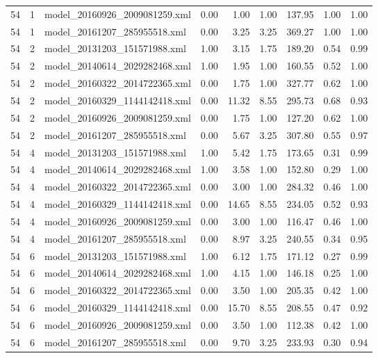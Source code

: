 \begin{table}[ht]
\begin{tabular}{rrlrrrrrr}
   54 &   1 & model\_20160926\_2009081259.xml & 0.00 & 1.00 & 1.00 & 137.95 & 1.00 & 1.00 \\ 
   54 &   1 & model\_20161207\_285955518.xml & 0.00 & 3.25 & 3.25 & 369.27 & 1.00 & 1.00 \\ 
   54 &   2 & model\_20131203\_151571988.xml & 1.00 & 3.15 & 1.75 & 189.20 & 0.54 & 0.99 \\ 
   54 &   2 & model\_20140614\_2029282468.xml & 1.00 & 1.95 & 1.00 & 160.55 & 0.52 & 1.00 \\ 
   54 &   2 & model\_20160322\_2014722365.xml & 0.00 & 1.75 & 1.00 & 327.77 & 0.62 & 1.00 \\ 
   54 &   2 & model\_20160329\_1144142418.xml & 0.00 & 11.32 & 8.55 & 295.73 & 0.68 & 0.93 \\ 
   54 &   2 & model\_20160926\_2009081259.xml & 0.00 & 1.75 & 1.00 & 127.20 & 0.62 & 1.00 \\ 
   54 &   2 & model\_20161207\_285955518.xml & 0.00 & 5.67 & 3.25 & 307.80 & 0.55 & 0.97 \\ 
   54 &   4 & model\_20131203\_151571988.xml & 1.00 & 5.42 & 1.75 & 173.65 & 0.31 & 0.99 \\ 
   54 &   4 & model\_20140614\_2029282468.xml & 1.00 & 3.58 & 1.00 & 152.80 & 0.29 & 1.00 \\ 
   54 &   4 & model\_20160322\_2014722365.xml & 0.00 & 3.00 & 1.00 & 284.32 & 0.46 & 1.00 \\ 
   54 &   4 & model\_20160329\_1144142418.xml & 0.00 & 14.65 & 8.55 & 234.05 & 0.52 & 0.93 \\ 
   54 &   4 & model\_20160926\_2009081259.xml & 0.00 & 3.00 & 1.00 & 116.47 & 0.46 & 1.00 \\ 
   54 &   4 & model\_20161207\_285955518.xml & 0.00 & 8.97 & 3.25 & 240.55 & 0.34 & 0.95 \\ 
   54 &   6 & model\_20131203\_151571988.xml & 1.00 & 6.12 & 1.75 & 171.12 & 0.27 & 0.99 \\ 
   54 &   6 & model\_20140614\_2029282468.xml & 1.00 & 4.15 & 1.00 & 146.18 & 0.25 & 1.00 \\ 
   54 &   6 & model\_20160322\_2014722365.xml & 0.00 & 3.50 & 1.00 & 205.35 & 0.42 & 1.00 \\ 
   54 &   6 & model\_20160329\_1144142418.xml & 0.00 & 15.70 & 8.55 & 208.55 & 0.47 & 0.92 \\ 
   54 &   6 & model\_20160926\_2009081259.xml & 0.00 & 3.50 & 1.00 & 112.38 & 0.42 & 1.00 \\ 
   54 &   6 & model\_20161207\_285955518.xml & 0.00 & 9.70 & 3.25 & 233.93 & 0.30 & 0.94 \\ 

\end{tabular}
\end{table}
